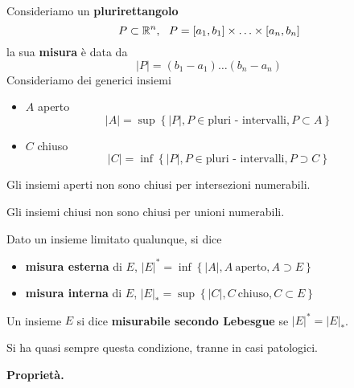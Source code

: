 Consideriamo un \textbf{plurirettangolo}
\begin{equation*}
P\subset \mathbb{R}^{n}, \ \ P = [a_{1}, b_{1}] \times \dotsc \times [a_{n}, b_{n}]
\end{equation*}
la sua \textbf{misura} è data da
\begin{equation*}
| P| = (b_{1} - a_{1}) \dotsc (b_{n} - a_{n})
\end{equation*}
Consideriamo dei generici insiemi
\begin{itemize}
\item $A$ aperto
\begin{equation*}
| A| = \sup \left\{| P|, P\in \text{pluri - intervalli}, P\subset A\right\}
\end{equation*}
\item $C$ chiuso
\begin{equation*}
| C| = \inf\left\{| P|, P\in \text{pluri - intervalli}, P\supset C\right\}
\end{equation*}
\end{itemize}
\begin{rem}
Gli insiemi aperti non sono chiusi per intersezioni numerabili.
\end{rem}
\begin{rem}
Gli insiemi chiusi non sono chiusi per unioni numerabili.
\end{rem}
Dato un insieme limitato qualunque, si dice
\begin{itemize}
\item \textbf{misura esterna} di $E$, $| E|^{*} = \inf\left\{| A|, A\ \text{aperto}, A\supset E\right\}$
\item \textbf{misura interna} di $E$, $| E|_{*} = \sup \left\{| C|, C\ \text{chiuso}, C\subset E\right\}$
\end{itemize}
\begin{defn}
Un insieme $E$ si dice \textbf{misurabile secondo Lebesgue} se $| E|^{*} = | E|_{*}$.
\end{defn}
Si ha quasi sempre questa condizione, tranne in casi patologici.

\textbf{Proprietà.}

